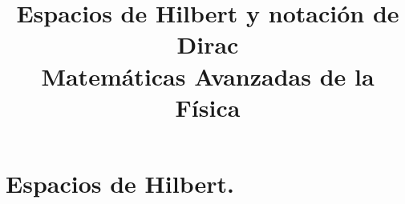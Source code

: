 
\usepackage{standalone}
\usepackage{geometry}
\geometry{top=1.25cm, bottom=1.5cm, left=1.25cm, right=1.25cm}
\title{Espacios de Hilbert y notación de Dirac \\ \large {Matemáticas Avanzadas de la Física}  \vspace{-1.5\baselineskip}}
\date{}

\renewcommand\labelenumii{\theenumi.{\arabic{enumii}}}
\maketitle
\fontsize{14}{14}\selectfont
\tableofcontents
\section{Espacios de Hilbert.}
